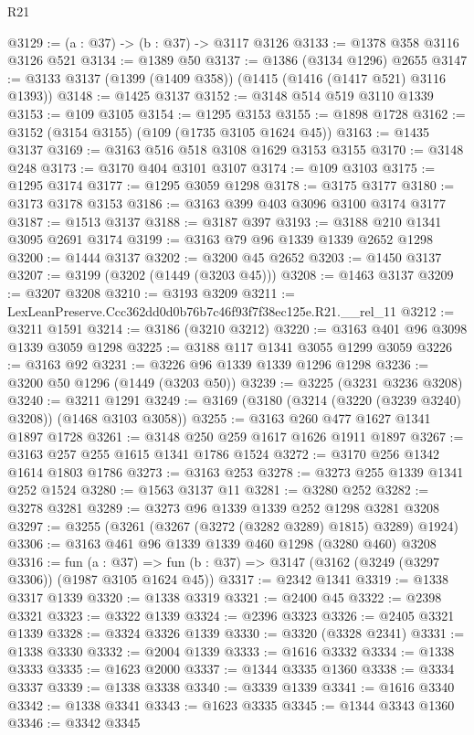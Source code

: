 \begin{lexlean}{R21}
\begin{coremodule}
@3129 := (a : @37) -> (b : @37) -> @3117 @3126
@3133 := @1378 @358 @3116 @3126 @521
@3134 := @1389 @50
@3137 := @1386 (@3134 @1296) @2655
@3147 := @3133 @3137 (@1399 (@1409 @358)) (@1415 (@1416 (@1417 @521) @3116 @1393))
@3148 := @1425 @3137
@3152 := @3148 @514 @519 @3110 @1339
@3153 := @109 @3105
@3154 := @1295 @3153
@3155 := @1898 @1728
@3162 := @3152 (@3154 @3155) (@109 (@1735 @3105 @1624 @45))
@3163 := @1435 @3137
@3169 := @3163 @516 @518 @3108 @1629 @3153 @3155
@3170 := @3148 @248
@3173 := @3170 @404 @3101 @3107
@3174 := @109 @3103
@3175 := @1295 @3174
@3177 := @1295 @3059 @1298
@3178 := @3175 @3177
@3180 := @3173 @3178 @3153
@3186 := @3163 @399 @403 @3096 @3100 @3174 @3177
@3187 := @1513 @3137
@3188 := @3187 @397
@3193 := @3188 @210 @1341 @3095 @2691 @3174
@3199 := @3163 @79 @96 @1339 @1339 @2652 @1298
@3200 := @1444 @3137
@3202 := @3200 @45 @2652
@3203 := @1450 @3137
@3207 := @3199 (@3202 (@1449 (@3203 @45)))
@3208 := @1463 @3137
@3209 := @3207 @3208
@3210 := @3193 @3209
@3211 := LexLeanPreserve.Ccc362dd0d0b76b7c46f93f7f38ec125e.R21.__rel_11
@3212 := @3211 @1591
@3214 := @3186 (@3210 @3212)
@3220 := @3163 @401 @96 @3098 @1339 @3059 @1298
@3225 := @3188 @117 @1341 @3055 @1299 @3059
@3226 := @3163 @92
@3231 := @3226 @96 @1339 @1339 @1296 @1298
@3236 := @3200 @50 @1296 (@1449 (@3203 @50))
@3239 := @3225 (@3231 @3236 @3208)
@3240 := @3211 @1291
@3249 := @3169 (@3180 (@3214 (@3220 (@3239 @3240) @3208)) (@1468 @3103 @3058))
@3255 := @3163 @260 @477 @1627 @1341 @1897 @1728
@3261 := @3148 @250 @259 @1617 @1626 @1911 @1897
@3267 := @3163 @257 @255 @1615 @1341 @1786 @1524
@3272 := @3170 @256 @1342 @1614 @1803 @1786
@3273 := @3163 @253
@3278 := @3273 @255 @1339 @1341 @252 @1524
@3280 := @1563 @3137 @11
@3281 := @3280 @252
@3282 := @3278 @3281
@3289 := @3273 @96 @1339 @1339 @252 @1298 @3281 @3208
@3297 := @3255 (@3261 (@3267 (@3272 (@3282 @3289) @1815) @3289) @1924)
@3306 := @3163 @461 @96 @1339 @1339 @460 @1298 (@3280 @460) @3208
@3316 := fun (a : @37) =>
  fun (b : @37) => @3147 (@3162 (@3249 (@3297 @3306)) (@1987 @3105 @1624 @45))
@3317 := @2342 @1341
@3319 := @1338 @3317 @1339
@3320 := @1338 @3319
@3321 := @2400 @45
@3322 := @2398 @3321
@3323 := @3322 @1339
@3324 := @2396 @3323
@3326 := @2405 @3321 @1339
@3328 := @3324 @3326 @1339
@3330 := @3320 (@3328 @2341)
@3331 := @1338 @3330
@3332 := @2004 @1339
@3333 := @1616 @3332
@3334 := @1338 @3333
@3335 := @1623 @2000
@3337 := @1344 @3335 @1360
@3338 := @3334 @3337
@3339 := @1338 @3338
@3340 := @3339 @1339
@3341 := @1616 @3340
@3342 := @1338 @3341
@3343 := @1623 @3335
@3345 := @1344 @3343 @1360
@3346 := @3342 @3345

\end{coremodule}
\end{lexlean}
